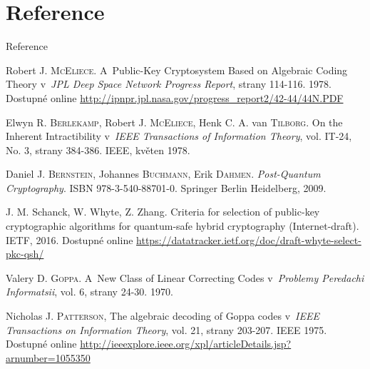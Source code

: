 \documentclass{beamer}
\begin{document}
\section*{Reference}
\begin{frame}{Reference}
    \begin{thebibliography}{99}

        Robert J. \textsc{McEliece}. A~Public-Key Cryptosystem Based on
        Algebraic Coding Theory v~\emph{JPL Deep Space Network Progress Report},
        strany 114-116. 1978. Dostupné online
        \url{http://ipnpr.jpl.nasa.gov/progress_report2/42-44/44N.PDF}

        Elwyn R. \textsc{Berlekamp}, Robert J. \textsc{McEliece}, Henk C. A. van
        \textsc{Tilborg}.  On the Inherent Intractibility v~\emph{IEEE
        Transactions of Information Theory}, vol. IT-24, No. 3, strany 384-386.
        IEEE, květen 1978.

        Daniel J. \textsc{Bernstein}, Johannes \textsc{Buchmann}, Erik
        \textsc{Dahmen}. \emph{Post-Quantum Cryptography}. ISBN
        978-3-540-88701-0.  Springer Berlin Heidelberg, 2009.

        J. M. Schanck, W. Whyte, Z. Zhang. Criteria for selection of public-key
        cryptographic algorithms for quantum-safe hybrid cryptography
        (Internet-draft). IETF, 2016. Dostupné online
        \url{https://datatracker.ietf.org/doc/draft-whyte-select-pkc-qsh/}

        Valery D. \textsc{Goppa}. A~New Class of Linear Correcting Codes
        v~\emph{Problemy Peredachi Informatsii}, vol. 6, strany 24-30. 1970.

        Nicholas J. \textsc{Patterson}, The algebraic decoding of Goppa codes
        v~\emph{IEEE Transactions on Information Theory}, vol. 21, strany
        203-207. IEEE 1975. Dostupné online
        \url{http://ieeexplore.ieee.org/xpl/articleDetails.jsp?arnumber=1055350}

    \end{thebibliography}

\end{frame}
\end{document}
